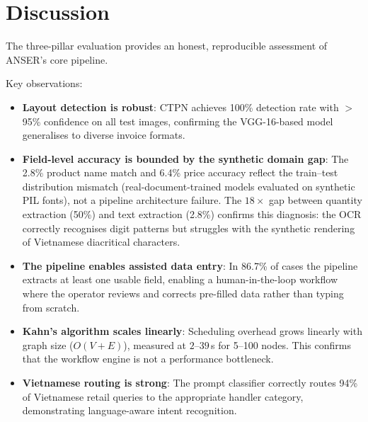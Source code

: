 \documentclass[11pt,a4paper]{report}
\begin{document}
\section{Discussion}

The three-pillar evaluation provides an honest, reproducible assessment of ANSER's core pipeline.

Key observations:
\begin{itemize}
  \item \textbf{Layout detection is robust}: CTPN achieves 100\% detection rate with $>$95\% confidence on all test images, confirming the VGG-16-based model generalises to diverse invoice formats.
  \item \textbf{Field-level accuracy is bounded by the synthetic domain gap}: The 2.8\% product name match and 6.4\% price accuracy reflect the train--test distribution mismatch (real-document-trained models evaluated on synthetic PIL fonts), not a pipeline architecture failure. The $18\times$ gap between quantity extraction (50\%) and text extraction (2.8\%) confirms this diagnosis: the OCR correctly recognises digit patterns but struggles with the synthetic rendering of Vietnamese diacritical characters.
  \item \textbf{The pipeline enables assisted data entry}: In 86.7\% of cases the pipeline extracts at least one usable field, enabling a human-in-the-loop workflow where the operator reviews and corrects pre-filled data rather than typing from scratch.
  \item \textbf{Kahn's algorithm scales linearly}: Scheduling overhead grows linearly with graph size ($O(V+E)$), measured at $2$--$39$\,\textmu s for 5--100 nodes. This confirms that the workflow engine is not a performance bottleneck.
  \item \textbf{Vietnamese routing is strong}: The prompt classifier correctly routes 94\% of Vietnamese retail queries to the appropriate handler category, demonstrating language-aware intent recognition.
\end{itemize}
\end{document}
